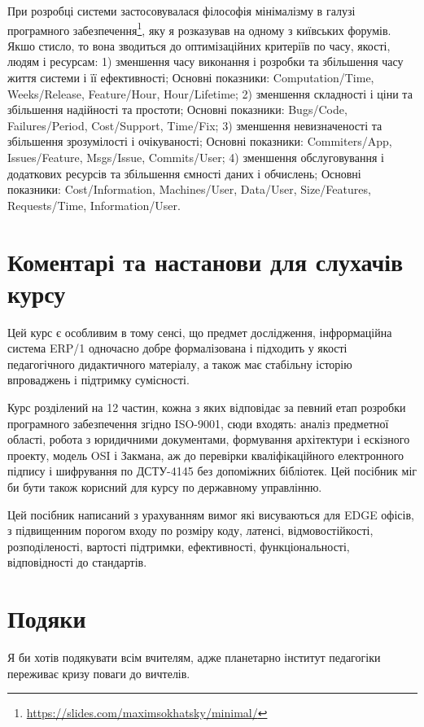При розробці системи застосовувалася філософія мінімалізму в галузі
програмного забезпечення\footnote{\url{https://slides.com/maximsokhatsky/minimal/}},
яку я розказував на одному з київських форумів. Якшо стисло, то вона
зводиться до оптимізаційних критеріїв по часу, якості, людям і ресурсам:
1) зменшення часу виконання і розробки та збільшення часу життя системи і її ефективності;
Основні показники: Computation/Time, Weeks/Release, Feature/Hour, Hour/Lifetime;
2) зменшення складності і ціни та збільшення надійності та простоти;
Основні показники: Bugs/Code, Failures/Period, Cost/Support, Time/Fix;
3) зменшення невизначеності та збільшення зрозумілості і очікуваності;
Основні показники: Commiters/App, Issues/Feature, Msgs/Issue, Commits/User;
4) зменшення обслуговування і додаткових ресурсів та збільшення ємності даних і обчислень;
Основні показники: Cost/Information, Machines/User, Data/User,
Size/Features, Requests/Time, Information/User.

\section*{Коментарі та настанови для слухачів курсу}

Цей курс є особливим в тому сенсі, що предмет дослідження,
інфрормаційна система ERP/1 одночасно добре формалізована
і підходить у якості педагогічного дидактичного матеріалу,
а також має стабільну історію впроваджень і підтримку сумісності.

Курс розділений на 12 частин, кожна з яких відповідає за певний
етап розробки програмного забезпечення згідно ISO-9001, сюди входять:
аналіз предметної області, робота з юридичними документами, формування
архітектури і ескізного проекту, модель OSI і Закмана, аж до перевірки
кваліфікаційного електронного підпису і шифрування по ДСТУ-4145 без
допоміжних бібліотек. Цей посібник міг би бути також корисний
для курсу по державному управлінню.

Цей посібник написаний з урахуванням вимог які висуваються для EDGE офісів,
з підвищенним порогом входу по розміру коду, латенсі, відмовостійкості,
розподіленості, вартості підтримки, ефективності, функціональності,
відповідності до стандартів.

\section*{Подяки}

Я би хотів подякувати всім вчителям, адже планетарно інститут
педагогіки переживає кризу поваги до вичтелів.

